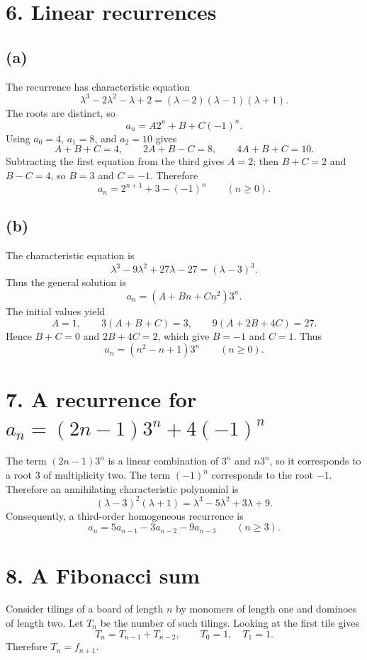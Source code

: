 \documentclass[11pt]{article}
\begin{document}
\section*{6. Linear recurrences}

\subsection*{(a)}

The recurrence has characteristic equation
\[
    \lambda^3-2\lambda^2-\lambda+2
    =(\lambda-2)(\lambda-1)(\lambda+1).
\]
The roots are distinct, so
\[
    a_n=A2^n+B+C(-1)^n.
\]
Using \(a_0=4\), \(a_1=8\), and \(a_2=10\) gives
\[
    A+B+C=4,\qquad 2A+B-C=8,\qquad 4A+B+C=10.
\]
Subtracting the first equation from the third gives \(A=2\); then
\(B+C=2\) and \(B-C=4\), so \(B=3\) and \(C=-1\). Therefore
\[
    \boxed{a_n=2^{n+1}+3-(-1)^n\qquad(n\geq 0).}
\]

\subsection*{(b)}

The characteristic equation is
\[
    \lambda^3-9\lambda^2+27\lambda-27=(\lambda-3)^3.
\]
Thus the general solution is
\[
    a_n=(A+Bn+Cn^2)3^n.
\]
The initial values yield
\[
    A=1,\qquad 3(A+B+C)=3,\qquad 9(A+2B+4C)=27.
\]
Hence \(B+C=0\) and \(2B+4C=2\), which give \(B=-1\) and \(C=1\). Thus
\[
    \boxed{a_n=(n^2-n+1)3^n\qquad(n\geq 0).}
\]

\section*{7. A recurrence for \(a_n=(2n-1)3^n+4(-1)^n\)}

The term \((2n-1)3^n\) is a linear combination of \(3^n\) and \(n3^n\),
so it corresponds to a root \(3\) of multiplicity two. The term \((-1)^n\)
corresponds to the root \(-1\). Therefore an annihilating characteristic
polynomial is
\[
    (\lambda-3)^2(\lambda+1)
    =\lambda^3-5\lambda^2+3\lambda+9.
\]
Consequently, a third-order homogeneous recurrence is
\[
    \boxed{a_n=5a_{n-1}-3a_{n-2}-9a_{n-3}\qquad(n\geq 3).}
\]

\section*{8. A Fibonacci sum}

Consider tilings of a board of length \(n\) by monomers of length one and
dominoes of length two. Let \(T_n\) be the number of such tilings. Looking at
the first tile gives
\[
    T_n=T_{n-1}+T_{n-2},\qquad T_0=1,\quad T_1=1.
\]
Therefore \(T_n=f_{n+1}\).
\end{document}
